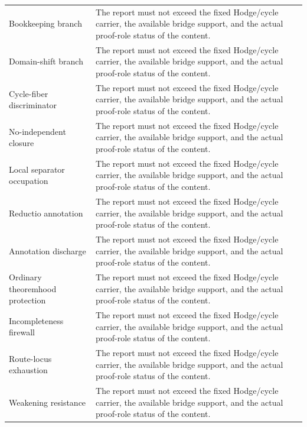 \documentclass[11pt]{article}
\begin{document}
{\begin{longtable}{p{}p{}}
Bookkeeping branch & The report must not exceed the fixed Hodge/cycle carrier, the available bridge support, and the actual proof-role status of the content.\\
Domain-shift branch & The report must not exceed the fixed Hodge/cycle carrier, the available bridge support, and the actual proof-role status of the content.\\
Cycle-fiber discriminator & The report must not exceed the fixed Hodge/cycle carrier, the available bridge support, and the actual proof-role status of the content.\\
No-independent closure & The report must not exceed the fixed Hodge/cycle carrier, the available bridge support, and the actual proof-role status of the content.\\
Local separator occupation & The report must not exceed the fixed Hodge/cycle carrier, the available bridge support, and the actual proof-role status of the content.\\
Reductio annotation & The report must not exceed the fixed Hodge/cycle carrier, the available bridge support, and the actual proof-role status of the content.\\
Annotation discharge & The report must not exceed the fixed Hodge/cycle carrier, the available bridge support, and the actual proof-role status of the content.\\
Ordinary theoremhood protection & The report must not exceed the fixed Hodge/cycle carrier, the available bridge support, and the actual proof-role status of the content.\\
Incompleteness firewall & The report must not exceed the fixed Hodge/cycle carrier, the available bridge support, and the actual proof-role status of the content.\\
Route-locus exhaustion & The report must not exceed the fixed Hodge/cycle carrier, the available bridge support, and the actual proof-role status of the content.\\
Weakening resistance & The report must not exceed the fixed Hodge/cycle carrier, the available bridge support, and the actual proof-role status of the content.\\
\bottomrule
\end{longtable}
}

\end{document}
